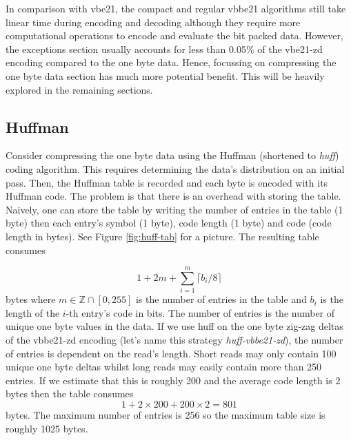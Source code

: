 


In comparison with vbe21, the compact and regular vbbe21 algorithms still take
linear time during encoding and decoding although they require more computational
operations to encode and evaluate the bit packed data. However, the exceptions
section usually accounts for less than 0.05\% of the vbe21-zd encoding
compared to the one byte data. Hence, focussing
on compressing the one byte data section has much more potential benefit. This
will be heavily explored in the remaining sections.

\subsection{Huffman}

Consider compressing the one byte data using the Huffman
(shortened to \textit{huff}) coding algorithm. This requires determining the
data's distribution on an initial pass. Then, the Huffman table is
recorded and each byte is encoded with its Huffman code. The problem is that
there is an overhead with storing the table.  Naively, one can store the table
by writing the number of entries in the table (1 byte) then each entry's symbol
(1 byte), code length (1 byte) and code (code length in bytes). See Figure
\ref{fig:huff-tab} for a picture. The resulting
table consumes

\[ 1 + 2m + \sum_{i=1}^m\lceil b_i / 8 \rceil \]
bytes where $m\in\mathbb{Z}\cap[0,255]$ is the number of entries in the table
and $b_i$ is the length of the $i$-th entry's code in bits. The number of
entries is the number of unique one byte values in the data.
If we use huff on the one byte zig-zag deltas of the vbbe21-zd encoding (let's name this strategy
\textit{huff-vbbe21-zd}), the number of entries is
dependent on the read's length. Short reads may only contain 100 unique one byte
deltas whilst long reads may easily contain more than 250 entries. If we
estimate that this is roughly 200 and the average code length is 2 bytes then
the table consumes
\[ 1 + 2\times 200 + 200\times 2 = 801 \]
bytes. The maximum number of entries is 256 so the maximum table size is roughly
1025 bytes.

